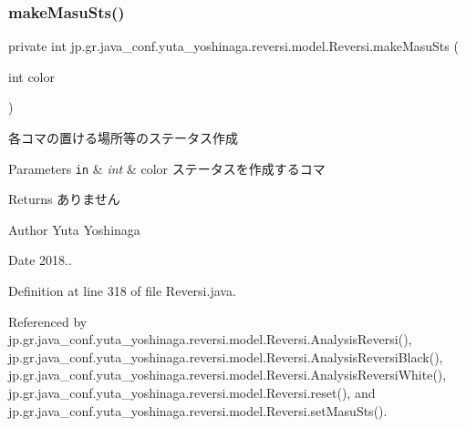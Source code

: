 \subsubsection{\texorpdfstring{make\+Masu\+Sts()}{makeMasuSts()}}
{\footnotesize\ttfamily private int jp.\+gr.\+java\+\_\+conf.\+yuta\+\_\+yoshinaga.\+reversi.\+model.\+Reversi.\+make\+Masu\+Sts (\begin{DoxyParamCaption}\item[{int}]{color }\end{DoxyParamCaption})\hspace{0.3cm}{\ttfamily [private]}}



各コマの置ける場所等のステータス作成 


\begin{DoxyParams}[1]{Parameters}
\mbox{\tt in}  & {\em int} & color ステータスを作成するコマ \\
\hline
\end{DoxyParams}
\begin{DoxyReturn}{Returns}
ありません 
\end{DoxyReturn}
\begin{DoxyAuthor}{Author}
Yuta Yoshinaga 
\end{DoxyAuthor}
\begin{DoxyDate}{Date}
2018.. 
\end{DoxyDate}


Definition at line 318 of file Reversi.\+java.



Referenced by jp.\+gr.\+java\+\_\+conf.\+yuta\+\_\+yoshinaga.\+reversi.\+model.\+Reversi.\+Analysis\+Reversi(), jp.\+gr.\+java\+\_\+conf.\+yuta\+\_\+yoshinaga.\+reversi.\+model.\+Reversi.\+Analysis\+Reversi\+Black(), jp.\+gr.\+java\+\_\+conf.\+yuta\+\_\+yoshinaga.\+reversi.\+model.\+Reversi.\+Analysis\+Reversi\+White(), jp.\+gr.\+java\+\_\+conf.\+yuta\+\_\+yoshinaga.\+reversi.\+model.\+Reversi.\+reset(), and jp.\+gr.\+java\+\_\+conf.\+yuta\+\_\+yoshinaga.\+reversi.\+model.\+Reversi.\+set\+Masu\+Sts().


